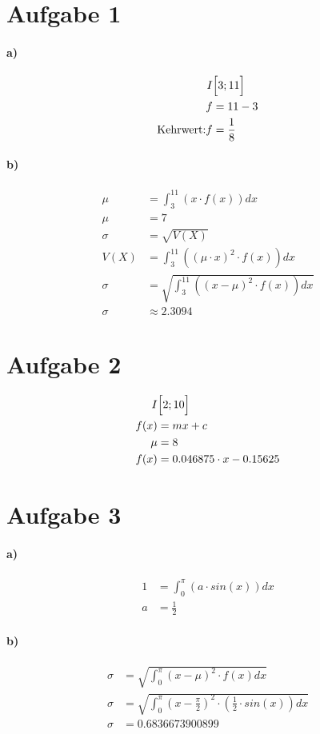 \documentclass[12pt,a4paper]{report}
\begin{document}
	\section{Aufgabe 1}
	\paragraph{a)}
	\begin{align*}
		I&\Bigl[3;11\Bigl] \\
		f &= 11-3 \\
		\text{Kehrwert:} f &= \frac{1}{8}
	\end{align*}
	\paragraph{b)}
	\begin{align*}
		\mu &= \int_{3}^{11} (x \cdot f(x)) dx \\
		\mu &= 7 \\
		\sigma &= \sqrt{V(X)} \\
		V(X) &= \int_3^{11}((\mu \cdot x)^2 \cdot f(x)) dx \\
		\sigma &= \sqrt{\int_3^{11}((x - \mu)^2 \cdot f(x)) dx} \\
		\sigma &\approx 2.3094 
	\end{align*}
	\section{Aufgabe 2}
	\begin{align*}
		I&\Bigl[2;10\Bigl] \\
		f(x) &= mx+c \\
		\mu &= 8 \\
		f(x) &= 0.046875 \cdot x - 0.15625
	\end{align*}
	\section{Aufgabe 3}
	\paragraph{a)}
	\begin{align*}
		1 &= \int_{0}^{\pi} (a\cdot sin(x)) dx \\
		a &= \frac{1}{2}
	\end{align*}
	\paragraph{b)}
	\begin{align*}
		\sigma &= \sqrt{\int_{0}^{\pi} (x-\mu)^2 \cdot f(x) dx} \\
		\sigma &= \sqrt{\int_{0}^{\pi} (x-\frac{\pi}{2})^2 \cdot (\frac{1}{2} \cdot sin(x)) dx} \\
		\sigma &= 0.6836673900899
	\end{align*}
\end{document}

